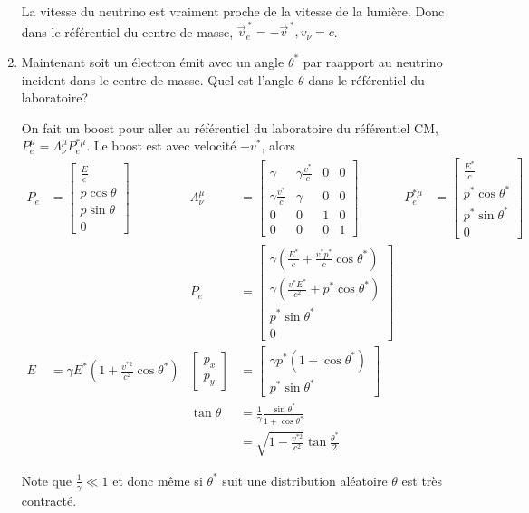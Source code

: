 \documentclass[10pt]{report}
\begin{document}
\begin{enumerate}[1.]
        La vitesse du neutrino est vraiment proche de la vitesse de la lumi\`ere. Donc dans le r\'ef\'erentiel du centre de masse, $\vec{v}^{\,*}_e = -\vec{v}^{\,*}, v_\nu = c$. 
    \item Maintenant soit un \'electron \'emit avec un angle $\theta^*$ par raapport au neutrino incident dans le centre de masse. Quel est l'angle $\theta$ dans le r\'ef\'erentiel du laboratoire?

        On fait un boost pour aller au r\'ef\'erentiel du laboratoire du r\'ef\'erentiel CM, $P_e^\mu = \Lambda_\nu^\mu P_e^{*\mu}$. Le boost est avec velocit\'e $-v^*$, alors
        \begin{align}
            P_e &= \begin{bmatrix} \frac{E}{c}\\ p\cos\theta\\ p\sin\theta\\0 \end{bmatrix}&
            \Lambda_\nu^\mu &= \begin{bmatrix} \gamma & \gamma\frac{v^*}{c} & 0 & 0\\
                \gamma \frac{v^*}{c} & \gamma & 0 & 0\\
                0 & 0 & 1 & 0\\
                0 & 0 & 0 & 1\end{bmatrix} &
            P_e^{*\mu} &= \begin{bmatrix} \frac{E^*}{c}\\ p^*\cos\theta^*\\ p^*\sin\theta^*\\ 0 \end{bmatrix}\\
            &&P_e &= \begin{bmatrix} \gamma\left( \frac{E^*}{c} + \frac{v^*p^*}{c} \cos\theta^* \right) \\ \gamma \left( \frac{v^*E^*}{c^2}+p^*\cos\theta^* \right)\\p^*\sin\theta^* \\ 0 \end{bmatrix} \\
            E &= \gamma E^*\left( 1 + \frac{v^{*2}}{c^2}\cos\theta^* \right) & \begin{bmatrix} p_x \\ p_y \end{bmatrix} &= \begin{bmatrix} \gamma p^*\left( 1 + \cos\theta^* \right) \\ p^*\sin\theta^* \end{bmatrix} \\
            &&\tan\theta &= \frac{1}{\gamma} \frac{\sin\theta^*}{1 + \cos\theta^*}\\
            &&&= \sqrt{1 - \frac{v^{*2}}{c^2}}\tan \frac{\theta^*}{2}
        \end{align}
        
        Note que $\frac{1}{\gamma} \ll 1$ et donc m\^eme si $\theta^*$ suit une distribution al\'eatoire $\theta$ est tr\`es contract\'e.
\end{enumerate}
\end{document}
